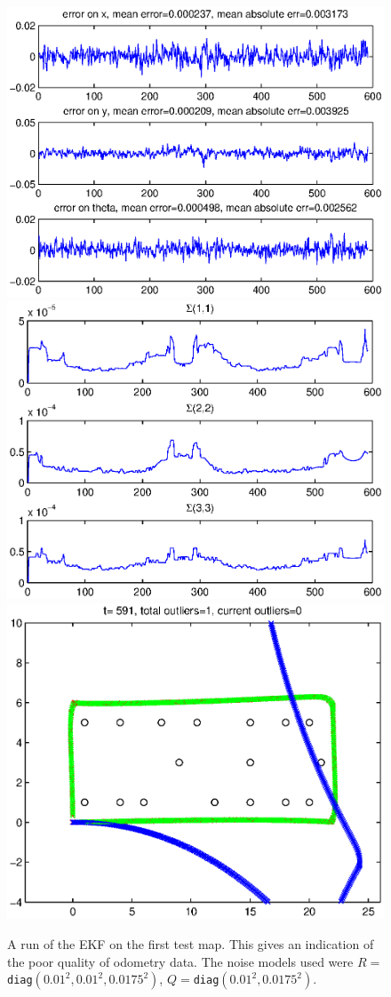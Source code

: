 \documentclass[a4paper,12pt]{article}
\begin{document}
\begin{figure}
  \centerline
  {
    \includegraphics[width=.43\textwidth]{figures/ekf/map1_seq_error}
    \includegraphics[width=.43\textwidth]{figures/ekf/map1_seq_sigma}
    \includegraphics[width=.43\textwidth]{figures/ekf/map1_seq_motion}
  }
  \caption{A run of the EKF on the first test map. This gives an indication of
    the poor quality of odometry data. The noise models used were
    $R=$\texttt{diag}$(0.01^2, 0.01^2, 0.0175^2)$, $Q=$\texttt{diag}$(0.01^2,
    0.0175^2)$.}
  \label{fig:map1}
\end{figure}
\end{document}
